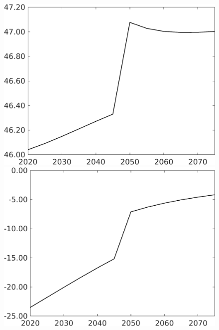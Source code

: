 \documentclass[12pt]{article}
\begin{document}
\begin{figure}[h!!]
\begin{minipage}[]{0.32\textwidth}
\end{minipage}		
\begin{minipage}[]{0.32\textwidth}
\includegraphics[width=1\textwidth]{../../codding_model/own_basedOnFried/optimalPol_010922_revision/figures/all_13Sept22/CompTaufPER_bytaul_Reg0_sff_spillover0_nsk0_xgr0_knspil0_sep0_LFlimit1_emsbase0_countec0_GovRev0_etaa0.79_lgd0.png}
\end{minipage}		
\begin{minipage}[]{0.32\textwidth}
\includegraphics[width=1\textwidth]{../../codding_model/own_basedOnFried/optimalPol_010922_revision/figures/all_13Sept22/CompTaufPER_bytaul_Reg0_sg_spillover0_nsk0_xgr0_knspil0_sep0_LFlimit1_emsbase0_countec0_GovRev0_etaa0.79_lgd0.png}

\end{minipage}
\end{figure}
\end{document}

